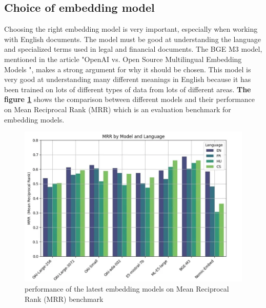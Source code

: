 \subsection{Choice of embedding model}
Choosing the right embedding model is very important, especially when working with English documents. The model must be good at understanding the language and specialized terms used in legal and financial documents.
\vskip 0.5cm
The BGE M3 model, mentioned in the article "OpenAI vs. Open Source Multilingual Embedding Models "\cite{w16}, makes a strong argument for why it should be chosen. This model is very good at understanding many different meanings in English because it has been trained on lots of different types of data from lots of different areas. \textbf{The figure \ref{fig:embed_comp}} shows the comparison between different models and their performance on Mean Reciprocal Rank (MRR) which is an evaluation benchmark for embedding models.
\begin{figure}[H]
    \centering
    \includegraphics[width=1 \linewidth]{assets/embed_md_comp.png}
    \caption{performance of the latest embedding models on Mean Reciprocal Rank (MRR) benchmark}
    \label{fig:embed_comp}
\end{figure}
